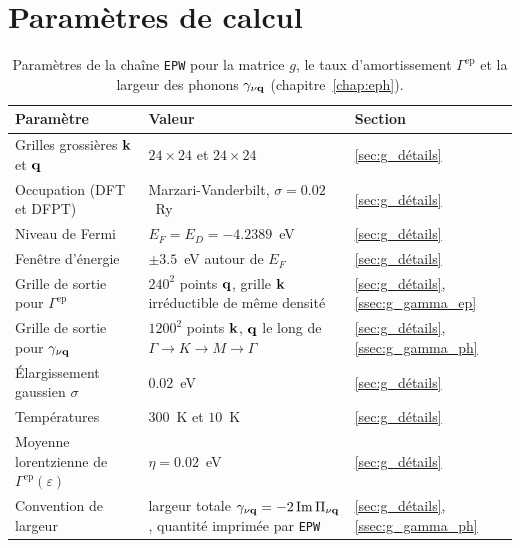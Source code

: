 \clearpage
\section{Paramètres de calcul}\label{sec:annexe_param_epw}

\vspace*{\fill}
\begin{table}[htbp]
    \centering
    \caption[Paramètres de la chaîne \texttt{EPW}.]{Paramètres de la chaîne \texttt{EPW} pour la matrice $g$, le taux d'amortissement $\Gamma^\text{ep}$ et la largeur des phonons $\gamma_{\nu\mathbf{q}}$ (chapitre~\ref{chap:eph}).}
    \label{tab:param_epw}
    \small
    \setlength{\tabcolsep}{4pt}
    \begin{tabular}{p{} p{} p{}}
        \hline\hline
        Paramètre & Valeur & Section \\
        \hline
        Grilles grossières $\mathbf{k}$ et $\mathbf{q}$ & $24\times 24$ et $24\times 24$ & \ref{sec:g_détails} \\
        Occupation (DFT et DFPT) & Marzari-Vanderbilt, $\sigma = 0.02$~Ry & \ref{sec:g_détails} \\
        Niveau de Fermi & $E_F = E_D = -4.2389$~eV & \ref{sec:g_détails} \\
        Fenêtre d'énergie & $\pm 3.5$~eV autour de $E_F$ & \ref{sec:g_détails} \\
        Grille de sortie pour $\Gamma^\text{ep}$ & $240^2$ points $\mathbf{q}$, grille $\mathbf{k}$ irréductible de même densité & \ref{sec:g_détails}, \ref{ssec:g_gamma_ep} \\
        Grille de sortie pour $\gamma_{\nu\mathbf{q}}$ & $1200^2$ points $\mathbf{k}$, $\mathbf{q}$ le long de $\Gamma\to K\to M\to\Gamma$ & \ref{sec:g_détails}, \ref{ssec:g_gamma_ph} \\
        Élargissement gaussien $\sigma$ & $0.02$~eV & \ref{sec:g_détails} \\
        Températures & $300$~K et $10$~K & \ref{sec:g_détails} \\
        Moyenne lorentzienne de $\Gamma^\text{ep}(\varepsilon)$ & $\eta = 0.02$~eV & \ref{sec:g_détails} \\
        Convention de largeur & largeur totale $\gamma_{\nu\mathbf{q}} = -2\,\mathrm{Im}\,\Pi_{\nu\mathbf{q}}$, quantité imprimée par \texttt{EPW} & \ref{sec:g_détails}, \ref{ssec:g_gamma_ph} \\
        \hline\hline
    \end{tabular}
\end{table}
\vspace*{\fill}
